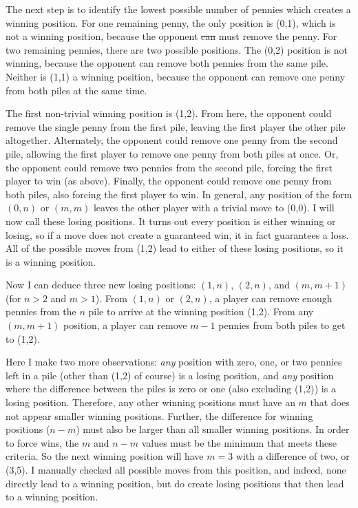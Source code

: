 \documentclass{article}
\begin{document}
The next step is to identify the lowest possible number of pennies which creates a winning position.
For one remaining penny, the only position is (0,1), which is not a winning position, because the opponent \sout{can} must remove the penny.
For two remaining pennies, there are two possible positions.
The (0,2) position is not winning, because the opponent can remove both pennies from the same pile.
Neither is (1,1) a winning position, because the opponent can remove one penny from both piles at the same time.

The first non-trivial winning position is (1,2).
From here, the opponent could remove the single penny from the first pile, leaving the first player the other pile altogether.
Alternately, the opponent could remove one penny from the second pile, allowing the first player to remove one penny from both piles at once.
Or, the opponent could remove two pennies from the second pile, forcing the first player to win (as above).
Finally, the opponent could remove one penny from both piles, also forcing the first player to win.
In general, any position of the form $(0,n)$ or $(m,m)$ leaves the other player with a trivial move to (0,0).
I will now call these losing positions.
It turns out every position is either winning or losing, so if a move does not create a guaranteed win, it in fact guarantees a loss.
All of the possible moves from (1,2) lead to either of these losing positions, so it is a winning position.

Now I can deduce three new losing positions: $(1,n)$, $(2,n)$, and $(m,m+1)$ (for $n>2$ and $m>1$).
From $(1,n)$ or $(2,n)$, a player can remove enough pennies from the $n$ pile to arrive at the winning position (1,2).
From any $(m,m+1)$ position, a player can remove $m-1$ pennies from both piles to get to (1,2).

Here I make two more observations: \textit{any} position with zero, one, or two pennies left in a pile (other than (1,2) of course) is a losing position, and \textit{any} position where the difference between the piles is zero or one (also excluding (1,2)) is a losing position.
Therefore, any other winning positions must have an $m$ that does not appear smaller winning positions.
Further, the difference for winning positions ($n-m$) must also be larger than all smaller winning positions.
In order to force wins, the $m$ and $n-m$ values must be the minimum that meets these criteria.
So the next winning position will have $m=3$ with a difference of two, or (3,5).
I manually checked all possible moves from this position, and indeed, none directly lead to a winning position, but do create losing positions that then lead to a winning position.
\end{document}

